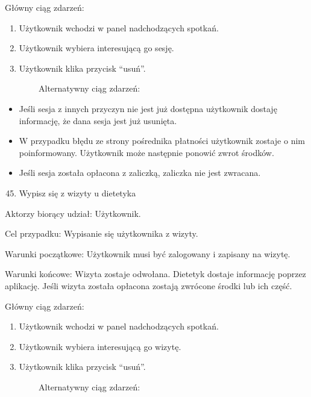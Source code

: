 {Główny ciąg zdarzeń: }

\begin{enumerate}
\tightlist
\item
  {Użytkownik wchodzi w panel nadchodzących spotkań.}
\item
  {Użytkownik wybiera interesującą go sesję.}
\item
  {Użytkownik klika przycisk ``usuń''.}
\end{enumerate}

{~~~~~~~~Alternatywny ciąg zdarzeń:}

\begin{itemize}
\tightlist
\item
  {Jeśli sesja z innych przyczyn nie jest już dostępna użytkownik
  dostaję informację, że dana sesja jest już usunięta.}
\item
  {W przypadku błędu ze strony pośrednika płatności użytkownik zostaje o
  nim poinformowany. Użytkownik może następnie ponowić zwrot środków.}
\item
  {Jeśli sesja została opłacona z zaliczką, zaliczka nie jest zwracana.}
\end{itemize}

{}

\begin{enumerate}
\setcounter{enumi}{44}
\tightlist
\item
  {Wypisz się z wizyty u dietetyka}
\end{enumerate}

{Aktorzy biorący udział: Użytkownik.}

{Cel przypadku: Wypisanie się użytkownika z wizyty.}

{Warunki początkowe: Użytkownik musi być zalogowany i zapisany na
wizytę. }

{Warunki końcowe: Wizyta zostaje odwołana. Dietetyk dostaje informację
poprzez aplikację. Jeśli wizyta została opłacona zostają zwrócone środki
lub ich część.}

{Główny ciąg zdarzeń: }

\begin{enumerate}
\tightlist
\item
  {Użytkownik wchodzi w panel nadchodzących spotkań.}
\item
  {Użytkownik wybiera interesującą go wizytę.}
\item
  {Użytkownik klika przycisk ``usuń''.}
\end{enumerate}

{~~~~~~~~Alternatywny ciąg zdarzeń:}


